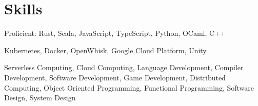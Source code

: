 \section{Skills}

%
{}%
{}%
{\small Proficient: Rust, Scala, JavaScript, TypeScript, Python, OCaml, C++%
\normalsize}%
{}

%
{}%
{}%
{\small Kubernetes, Docker, OpenWhisk, Google Cloud Platform, Unity \normalsize}%
{}

%
{}%
{}%
{\small Serverless Computing, Cloud Computing, Language Development, Compiler
Development, Software Development, Game Development, Distributed Computing,
Object Oriented Programming, Functional Programming, Software Design, System
Design \normalsize}%
{}